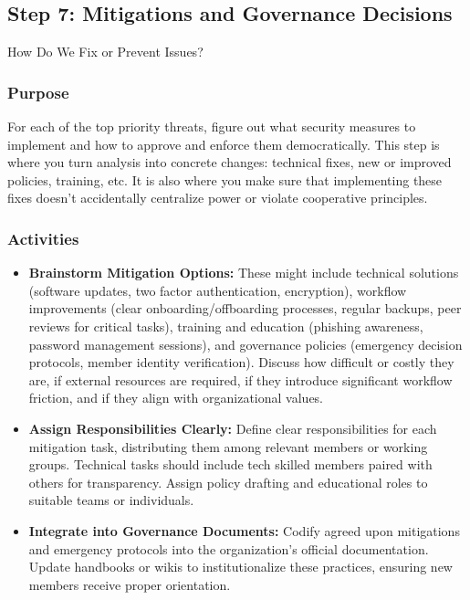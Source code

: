 \subsection{Step 7: Mitigations and Governance Decisions}
\label{subsec:Step7}

How Do We Fix or Prevent Issues?

\subsubsection{Purpose}

For each of the top priority threats, figure out what
security measures to implement and how to approve and enforce them
democratically. This step is where you turn analysis into concrete changes:
technical fixes, new or improved policies, training, etc. It is also where you
make sure that implementing these fixes doesn't accidentally centralize power or
violate cooperative principles.

\subsubsection{Activities}

\begin{itemize}

    \item \textbf{Brainstorm Mitigation Options:} These might include technical solutions (software
    updates, two factor authentication, encryption), workflow improvements
    (clear onboarding/offboarding processes, regular backups, peer reviews
    for critical tasks), training and education (phishing awareness, password
    management sessions), and governance policies (emergency decision protocols,
    member identity verification). Discuss how difficult or costly they are, if
    external resources are required, if they introduce significant workflow
    friction, and if they align with organizational values.
    
    \item \textbf{Assign Responsibilities Clearly:} Define clear responsibilities
    for each mitigation task, distributing them among relevant members or working
    groups. Technical tasks should include tech skilled members paired with others
    for transparency. Assign policy drafting and educational roles to suitable teams
    or individuals.
    
    \item \textbf{Integrate into Governance Documents:} Codify agreed upon
    mitigations and emergency protocols into the organization's official
    documentation. Update handbooks or wikis to institutionalize these practices,
    ensuring new members receive proper orientation.
    
\end{itemize}

